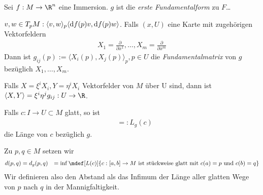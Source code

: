 Sei $f : M \to \R^n$ eine Immersion. $g$ ist die \emph{erste Fundamentalform} zu
$F$\dots

$v,w \in T_p M : \langle v,w\rangle_p \langle \mathrm d f(p)v, \mathrm d f(p)w\rangle$. Falls
$(x, U)$ eine Karte mit zugehörigen Vektorfeldern
\begin{align}
  X_1 = \frac{\partial}{\partial x^1}, \dots, X_m = \frac{\partial}{\partial x^m}
\end{align}
Dann ist $g_{ij}(p) := \langle X_i(p), X_j(p)\rangle_p, p\in U$ die
\emph{Fundamentalmatrix} von $g$ bezüglich $X_1, \dots, X_m$.

Falls $X = \xi^iX_i, Y = \eta^iX_i$ Vektorfelder von $M$ über U sind, dann ist
$\langle X, Y\rangle = \xi^i\eta^jg_{ij} : U \to \R$.

Falls $c : I \to U \subset M$ glatt, so ist
\begin{align}
              &=: L_g(c)
\end{align}
die Länge von $c$ bezüglich $g$.

Zu $p,q\in M$ setzen wir
\begin{align}
  d(p,q) &= d_g(p,q) &= \inf\mdef[L(c)]{c:[a,b]\to M \text{ ist stückweise glatt
  mit } c(a) = p \text{ und  } c(b) = q}
\end{align}
Wir definieren also den Abstand als das Infimum der Länge aller glatten Wege von
$p$ nach $q$ in der Mannigfaltigkeit.

